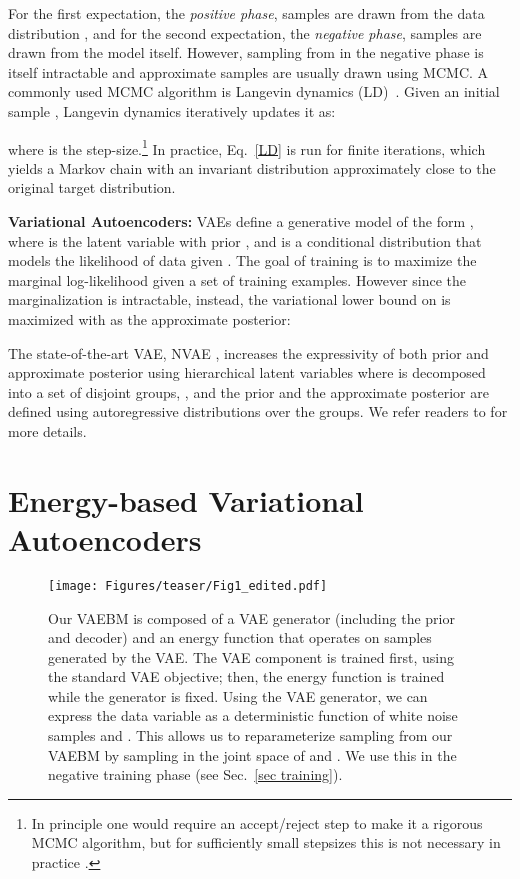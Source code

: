 \documentclass{article} \usepackage{iclr2021_conference,times}
\begin{document}
For the first expectation, the \textit{positive phase}, samples are drawn from the data distribution , and for the second expectation, the \textit{negative phase}, samples are drawn from the model  itself. 
However, sampling from  in the negative phase is itself intractable and approximate samples are usually drawn using MCMC. A commonly used MCMC algorithm is Langevin dynamics (LD)~\citep{neal1993probabilistic}. Given an initial sample , Langevin dynamics iteratively updates it as:

where  is the step-size.\footnote{In principle one would require an accept/reject step to make it a rigorous MCMC algorithm, but for sufficiently small stepsizes this is not necessary in practice \citep{neal1993probabilistic}.} In practice, Eq.~\ref{LD} is run for finite iterations, which yields a Markov chain with an invariant distribution approximately close to the original target distribution. 



\textbf{Variational Autoencoders:}
VAEs define a generative model of the form , where  is the latent variable with prior , and  is a conditional distribution that models the likelihood of data  given . The goal of training is to maximize the marginal log-likelihood  given a set of training examples. However since the marginalization is intractable, instead, the variational lower bound on  is maximized with  as the approximate posterior: 


The state-of-the-art VAE, NVAE \citep{vahdat2020nvae}, increases the expressivity of both prior and approximate posterior using hierarchical latent variables \citep{kingma2016improved} where  is decomposed into a set of disjoint groups, , and the prior  and the approximate posterior  are defined using autoregressive distributions over the groups. We refer readers to \citet{vahdat2020nvae} for more details.
 \section{Energy-based Variational Autoencoders}
\begin{figure*}[t]
    \centering
    \texttt{[image: Figures/teaser/Fig1\_edited.pdf]}
    \caption{Our VAEBM is composed of a VAE generator (including the prior and decoder) and an energy function that operates on samples  generated by the VAE. The VAE component is trained first, using the standard VAE objective; then, the energy function is trained while the generator is fixed. 
    Using the VAE generator, we can express the data variable  as a deterministic function of white noise samples  and . This allows us to reparameterize sampling from our VAEBM by sampling in the joint space of  and . We use this in the negative training phase (see Sec.~\ref{sec training}).
}
    \label{fig1}
\end{figure*}
\end{document}
